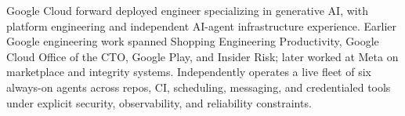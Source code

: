 


Google Cloud forward deployed engineer specializing in generative AI, with platform engineering and independent AI-agent infrastructure experience. Earlier Google engineering work spanned Shopping Engineering Productivity, Google Cloud Office of the CTO, Google Play, and Insider Risk; later worked at Meta on marketplace and integrity systems. Independently operates a live fleet of six always-on agents across repos, CI, scheduling, messaging, and credentialed tools under explicit security, observability, and reliability constraints.







